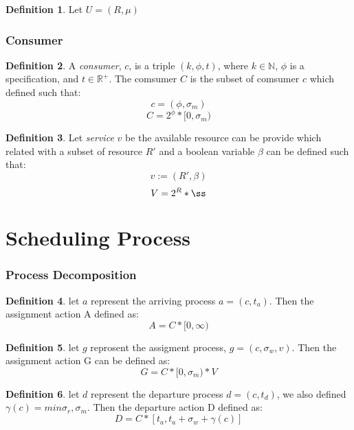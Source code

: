\documentclass{article}
\theoremstyle{definition}
\newtheorem{definition}{Definition}[section]
\theoremstyle{remark}
\theoremstyle{theorem}
\theoremstyle{definition}
\begin{document}
	\begin{definition}
		Let $U = (R, \mu)$ 
		
	\end{definition}
	
	\section{Consumer}
	
	\begin{definition}
		A \emph{consumer}, $c$, is a triple $(k, \phi, t)$, where $k \in \mathbb{N}$, $\phi$ is a specification, and $t \in \mathbb{R}^{+}$. The comsumer $C$ is the subset of comsumer $c$ which defined such that:
		\[
		c = (\phi , \sigma_m)
		\]
		\[
		C = 2^{\phi}*[0,\sigma_m)
		\]
		
	\end{definition}

	\begin{definition}
		Let \emph{service} $v$ be the available resource can be provide which related with a subset of resource $R'$ and a boolean variable $\beta$ can be defined such that:
		\[
		v := (R', \beta)
		\]
		\[
		V = 2^{R}*{\ss}
		\]
	
	\end{definition}
	
	\part{Scheduling Process}
	
	\section{Process Decomposition}
	
	\begin{definition}
		let $a$ represent the arriving process $a = (c, t_a)$. Then the assignment action A defined as:
		\[
		A = C * [0, \infty)
		\]
	\end{definition}
	
	\begin{definition}
		let $g$ reprosent the assigment process, $g = (c,\sigma_w, v)$. Then the assignment action G can be defined as:
		\[
		G = C*[0,\sigma_m)*V
		\]
	
	\end{definition}

	\begin{definition}
		let $d$ represent the departure process $d = (c, t_d)$, we also defined $\gamma(c) = min{\sigma_r,\sigma_m}.$ Then the departure action D defined as:
		\[
		D = C * [t_a, t_a + \sigma_w + \gamma(c)]
		\]
	\end{definition}
	
\end{document}
